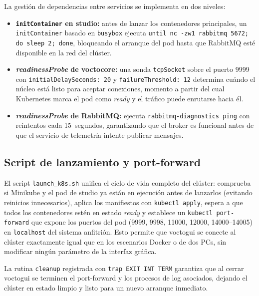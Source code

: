 La gestión de dependencias entre servicios se implementa en dos niveles:

\begin{itemize}
  \item \textbf{\texttt{initContainer} en studio:} antes de lanzar los contenedores
        principales, un \texttt{initContainer} basado en \texttt{busybox} ejecuta
        \texttt{until nc -zw1 rabbitmq 5672; do sleep 2; done}, bloqueando el arranque
        del pod hasta que RabbitMQ esté disponible en la red del clúster.
  \item \textbf{\textit{readinessProbe} de voctocore:} una sonda \texttt{tcpSocket}
        sobre el puerto 9999 con \texttt{initialDelaySeconds: 20} y
        \texttt{failureThreshold: 12} determina cuándo el núcleo está listo para
        aceptar conexiones, momento a partir del cual Kubernetes marca el pod como
        \textit{ready} y el tráfico puede enrutarse hacia él.
  \item \textbf{\textit{readinessProbe} de RabbitMQ:} ejecuta
        \texttt{rabbitmq-diagnostics ping} con reintentos cada 15~segundos, garantizando
        que el broker es funcional antes de que el servicio de telemetría intente
        publicar mensajes.
\end{itemize}

\subsection{Script de lanzamiento y port-forward}

El script \texttt{launch\_k8s.sh} unifica el ciclo de vida completo del clúster:
comprueba si Minikube y el pod de studio ya están en ejecución antes de lanzarlos
(evitando reinicios innecesarios), aplica los manifiestos con \texttt{kubectl apply},
espera a que todos los contenedores estén en estado \textit{ready} y establece un
\texttt{kubectl port-forward} que expone los puertos del pod
(9999, 9998, 11000, 12000, 14000--14005) en \texttt{localhost} del sistema anfitrión.
Esto permite que voctogui se conecte al clúster exactamente igual que en los escenarios
Docker o de dos PCs, sin modificar ningún parámetro de la interfaz gráfica.

La rutina \texttt{cleanup} registrada con \texttt{trap EXIT INT TERM} garantiza que
al cerrar voctogui se terminen el port-forward y los procesos de log asociados,
dejando el clúster en estado limpio y listo para un nuevo arranque inmediato.
